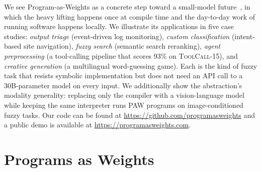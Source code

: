 \documentclass{article}
\theoremstyle{plain}
\theoremstyle{definition}
\theoremstyle{remark}
\begin{document}
We see Program-as-Weights as a concrete step toward a small-model future~\citep{belcak2025smalllanguagemodelsfuture}, in which the heavy lifting happens once at compile time and the day-to-day work of running software happens locally.
We illustrate its applications in five case studies: \emph{output triage} (event-driven log monitoring), \emph{custom classification} (intent-based site navigation), \emph{fuzzy search} (semantic search reranking), \emph{agent preprocessing} (a tool-calling pipeline that scores 93\% on \textsc{ToolCall-15}), and \emph{creative generation} (a multilingual word-guessing game). Each is the kind of fuzzy task that resists symbolic implementation but does not need an API call to a 30B-parameter model on every input.
We additionally show the abstraction's modality generality: replacing only the compiler with a vision-language model while keeping the same interpreter runs PAW programs on image-conditioned fuzzy tasks. 
Our code can be found at \url{https://github.com/programasweights} and a public demo is available at \url{https://programasweights.com}.



\section{Programs as Weights}
\label{sec:paradigm}

\end{document}
